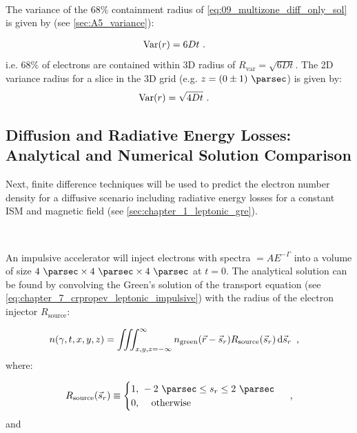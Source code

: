 \par~\par 
The variance of the $68\%$ containment radius of \autoref{eq:09_multizone_diff_only_sol} is given by (see \autoref{sec:A5_variance}):

\begin{equation}
	\begin{aligned}
		\mathrm{Var}\qty(r)&=6Dt\text{ .} 
	\end{aligned}
\end{equation}
\noindent i.e. $68\%$ of electrons are contained within 3D radius of $R_\text{var}=\sqrt{6Dt}$. The 2D variance radius for a slice in the 3D grid (e.g. $z=(0\pm 1)~\pc$) is given by:
\begin{equation}
	\begin{aligned}
		\mathrm{Var}\qty(r)&=\sqrt{4Dt}\text{ .} 
	\end{aligned}
\end{equation}


\subsection{Diffusion and Radiative Energy Losses: Analytical and Numerical Solution Comparison}

Next, finite difference techniques will be used to predict the electron number density for a diffusive scenario including radiative energy losses for a constant ISM and magnetic field (see \autoref{sec:chapter_1_leptonic_gre}).
\par~\par
An impulsive accelerator will inject electrons with spectra $=AE^{-\Gamma}$ into a volume of size $4~\pc \times 4~\pc \times 4~\pc$ at $t=0$. The analytical solution can be found by convolving the Green's solution of the transport equation (see \autoref{eq:chapter_7_crpropev_leptonic_impulsive}) with the radius of the electron injector $R_\text{source}$:

\begin{equation}
	\begin{aligned}
		n\qty(\gamma,t,x,y,z)&=\iiint_{x,y,z=-\infty}^{\infty} n_\text{green}\qty(\vec{r}-\vec{s}_r)R_\text{source}\qty(\vec{s}_r)\dd{\vec{s}_r} \text{ ,} 
	\end{aligned} \label{eq:chapter_9_multizone_diff_exact}
\end{equation}
\noindent where:

\begin{equation}
    \begin{aligned}
    R_\text{source}\qty(\vec{s}_r)\equiv
    \begin{cases}
    1\text{, }-2~\pc\leq s_r\leq 2~\pc \\
    0\text{, }\quad\text{otherwise}
    \end{cases}\text{ ,} 
    \end{aligned} \label{eq:09_multizone_source_func}
\end{equation}
\noindent and

